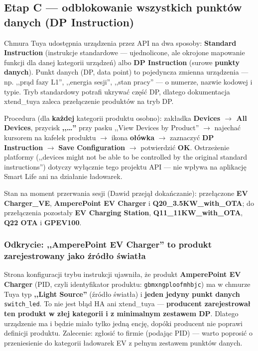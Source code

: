 \documentclass[11pt,a4paper]{article}
\begin{document}
\subsection{Etap C --- odblokowanie wszystkich punktów danych (DP Instruction)}
\label{sec:etapc}

Chmura Tuya udostępnia urządzenia przez API na dwa sposoby: \textbf{Standard Instruction} (instrukcje standardowe --- ujednolicone, ale okrojone mapowanie funkcji dla danej kategorii urządzeń) albo \textbf{DP Instruction} (surowe \textbf{punkty danych}). Punkt danych (DP, data point) to pojedyncza zmienna urządzenia --- np. ,,prąd fazy L1'', ,,energia sesji'', ,,stan pracy'' --- o numerze, nazwie kodowej i typie. Tryb standardowy potrafi ukrywać część DP, dlatego dokumentacja xtend\_tuya zaleca przełączenie produktów na tryb DP.

Procedura (dla \textbf{każdej} kategorii produktu osobno): zakładka \textbf{Devices $\to$ All Devices}, przycisk \textbf{,,\ldots''} przy pasku ,,View Devices by Product'' $\to$ najechać kursorem na kafelek produktu $\to$ ikona \textbf{ołówka} $\to$ zaznaczyć \textbf{DP Instruction} $\to$ \textbf{Save Configuration} $\to$ potwierdzić \textbf{OK}. Ostrzeżenie platformy (,,devices might not be able to be controlled by the original standard instructions'') dotyczy wyłącznie tego projektu API --- nie wpływa na aplikację Smart Life ani na działanie ładowarek.

Stan na moment przerwania sesji (Dawid przejął dokańczanie): przełączone \textbf{EV Charger\_VE}, \textbf{AmperePoint EV Charger} i \textbf{Q20\_3.5KW\_with\_OTA}; do przełączenia pozostały \textbf{EV Charging Station}, \textbf{Q11\_11KW\_with\_OTA}, \textbf{Q22 OTA} i \textbf{GPEV100}.

\subsubsection{Odkrycie: ,,AmperePoint EV Charger'' to produkt zarejestrowany jako źródło światła}
\label{sec:lightsource}

Strona konfiguracji trybu instrukcji ujawniła, że produkt \textbf{AmperePoint EV Charger} (PID, czyli identyfikator produktu: \texttt{gbmxngploofmhbjc}) ma w chmurze Tuya typ \textbf{,,Light Source''} (źródło światła) i \textbf{jeden jedyny punkt danych} \texttt{switch\_led}. To nie jest błąd HA ani xtend\_tuya --- \textbf{producent zarejestrował ten produkt w złej kategorii i z minimalnym zestawem DP}. Dlatego urządzenie ma i będzie miało tylko jedną encję, dopóki producent nie poprawi definicji produktu. Zalecenie: zgłosić to firmie (podając PID) --- warto poprosić o przeniesienie do kategorii ładowarek EV z pełnym zestawem punktów danych.
\end{document}

